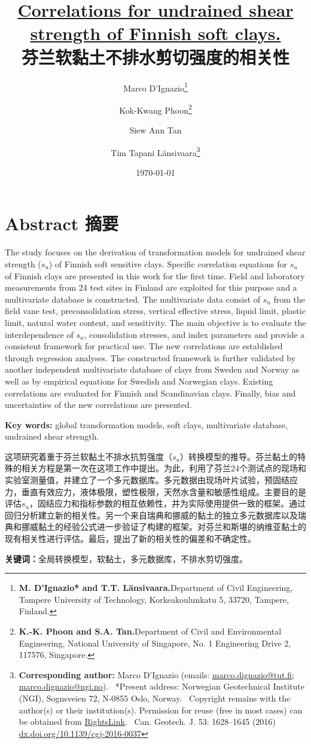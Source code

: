 \documentclass{myarticle}
\title{\textbf{\href{http://dx.doi.org/10.1139/cgj-2016-0037}{Correlations for undrained shear strength of Finnish soft clays.}\\芬兰软黏土不排水剪切强度的相关性}}
\date{\today}
\author{Marco D’Ignazio\thanks{
    \textbf{M. D’Ignazio* and T.T. Länsivaara.}Department of Civil Engineering, Tampere University of Technology, Korkeakoulunkatu 5, 33720, Tampere, Finland.
} \and Kok-Kwang Phoon\thanks{
    \textbf{K.-K. Phoon and S.A. Tan.}Department of Civil and Environmental Engineering, National University of Singapore, No. 1 Engineering Drive 2, 117576, Singapore.
} \and Siew Ann Tan \and Tim Tapani Länsivaara\thanks{
    \textbf{Corresponding author:} Marco D’Ignazio (emails: \url{marco.dignazio@tut.ﬁ}; \url{marco.dignazio@ngi.no}).\newline{}
    \indent{}~*Present address: Norwegian Geotechnical Institute (NGI), Sognsveien 72, N-0855 Oslo, Norway.\newline{}
    \indent{}~Copyright remains with the author(s) or their institution(s). Permission for reuse (free in most cases) can be obtained from \href{https://www.nrcresearchpress.com/page/authors/services/reprints}{RightsLink}.\newline{}\newline{}
    \indent{}~Can. Geotech. J. 53: 1628–1645 (2016) \href{http://dx.doi.org/10.1139/cgj-2016-0037}{dx.doi.org/10.1139/cgj-2016-0037}
}}
\begin{document}
\maketitle

\section*{Abstract 摘要}

\begin{Parallel}{0.60\textwidth}{}
    \ParallelLText
    {
        The study focuses on the derivation of transformation models for undrained shear strength ($s_u$) of Finnish soft sensitive clays. Speciﬁc correlation equations for $s_u$ of Finnish clays are presented in this work for the ﬁrst time. Field and laboratory measurements from 24 test sites in Finland are exploited for this purpose and a multivariate database is constructed. The multivariate data consist of $s_u$ from the ﬁeld vane test, preconsolidation stress, vertical effective stress, liquid limit, plastic limit, natural water content, and sensitivity. The main objective is to evaluate the interdependence of $s_u$, consolidation stresses, and index parameters and provide a consistent framework for practical use. The new correlations are established through regression analyses. The constructed framework is further validated by another independent multivariate database of clays from Sweden and Norway as well as by empirical equations for Swedish and Norwegian clays. Existing correlations are evaluated for Finnish and Scandinavian clays. Finally, bias and uncertainties of the new correlations are presented.

        \textbf{Key words: }global transformation models, soft clays, multivariate database, undrained shear strength.
    }
    \ParallelRText
    {
        这项研究着重于芬兰软黏土不排水抗剪强度（$s_u$）转换模型的推导。芬兰黏土的特殊的相关方程是第一次在这项工作中提出。为此，利用了芬兰24个测试点的现场和实验室测量值，并建立了一个多元数据库。多元数据由现场叶片试验，预固结应力，垂直有效应力，液体极限，塑性极限，天然水含量和敏感性组成。主要目的是评估$s_u$，固结应力和指标参数的相互依赖性，并为实际使用提供一致的框架。通过回归分析建立新的相关性。另一个来自瑞典和挪威的黏土的独立多元数据库以及瑞典和挪威黏土的经验公式进一步验证了构建的框架。对芬兰和斯堪的纳维亚黏土的现有相关性进行评估。最后，提出了新的相关性的偏差和不确定性。

        \textbf{关键词：}全局转换模型，软黏土，多元数据库，不排水剪切强度。
    }
\end{Parallel}




\begin{appendix}
\end{appendix}


\end{document}

